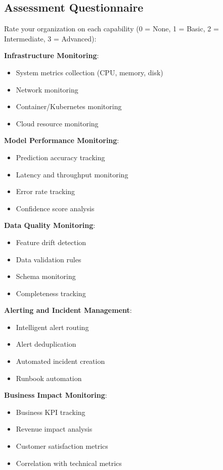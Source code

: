 \subsection{Assessment Questionnaire}

Rate your organization on each capability (0 = None, 1 = Basic, 2 = Intermediate, 3 = Advanced):

\textbf{Infrastructure Monitoring}:
\begin{itemize}
    \item [ ] System metrics collection (CPU, memory, disk)
    \item [ ] Network monitoring
    \item [ ] Container/Kubernetes monitoring
    \item [ ] Cloud resource monitoring
\end{itemize}

\textbf{Model Performance Monitoring}:
\begin{itemize}
    \item [ ] Prediction accuracy tracking
    \item [ ] Latency and throughput monitoring
    \item [ ] Error rate tracking
    \item [ ] Confidence score analysis
\end{itemize}

\textbf{Data Quality Monitoring}:
\begin{itemize}
    \item [ ] Feature drift detection
    \item [ ] Data validation rules
    \item [ ] Schema monitoring
    \item [ ] Completeness tracking
\end{itemize}

\textbf{Alerting and Incident Management}:
\begin{itemize}
    \item [ ] Intelligent alert routing
    \item [ ] Alert deduplication
    \item [ ] Automated incident creation
    \item [ ] Runbook automation
\end{itemize}

\textbf{Business Impact Monitoring}:
\begin{itemize}
    \item [ ] Business KPI tracking
    \item [ ] Revenue impact analysis
    \item [ ] Customer satisfaction metrics
    \item [ ] Correlation with technical metrics
\end{itemize}

